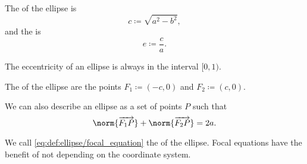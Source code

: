 \begin{definition}
   The  of the ellipse is
  \begin{equation*}
    c \coloneq \sqrt{ a^2 - b^2 },
  \end{equation*}
  and the  is
  \begin{equation*}
    e \coloneqq \frac c a.
  \end{equation*}

  The eccentricity of an ellipse is always in the interval \( [0, 1) \).

   The  of the ellipse are the points \( F_1 \coloneqq (-c, 0) \) and \( F_2 \coloneqq (c, 0) \).

   We can also describe an ellipse as a set of points \( P \) such that
  \begin{equation}\label{eq:def:ellipse/focal_equation}
    \norm{\vect{F_1 P}} + \norm{\vect{F_2 P}} = 2a.
  \end{equation}

  We call \eqref{eq:def:ellipse/focal_equation} the  of the ellipse. Focal equations have the benefit of not depending on the coordinate system.
\end{definition}
